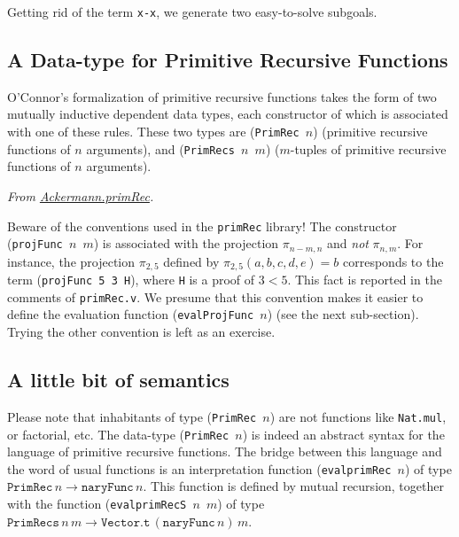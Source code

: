   Getting rid of the term \texttt{x-x}, we generate two easy-to-solve subgoals.

\vspace{6pt}
\noindent

  
\subsection{A Data-type for Primitive Recursive Functions}

O'Connor's formalization of primitive recursive functions takes the form of two mutually inductive dependent data types, each constructor of which is associated with one of these  rules.
These two types are (\texttt{PrimRec $n$}) (primitive recursive functions of $n$ arguments), and
(\texttt{PrimRecs $n$ $m$}) ($m$-tuples of primitive recursive functions of $n$ arguments).



\label{def:Primrec}
\vspace{4pt}
\noindent
\emph{From \href{../theories/html/hydras.Ackermann.primRec.html}{Ackermann.primRec}.}



\begin{remark}
\label{projFunc-order-of-args}
Beware of the conventions used in the \texttt{primRec} library!
The constructor (\texttt{projFunc $n$ $m$})  is associated with the projection $\pi_{n-m,n}$ and \emph{not}
$\pi_{n, m}$.
For instance, the projection $\pi_{2,5}$ defined by $\pi_{2,5}(a,b,c,d,e)=b$ corresponds to the term
(\texttt{projFunc 5 3 H}), where \texttt{H} is a proof of $3<5$.
 This fact is reported in the comments of \texttt{primRec.v}. We presume that this convention makes it easier to define the evaluation function (\texttt{evalProjFunc $n$}) (see the next sub-section). Trying the other convention is left as an exercise.
\end{remark}



\subsection{A little bit of semantics} 
Please note that inhabitants of type (\texttt{PrimRec $n$}) are not \coq{} functions like \texttt{Nat.mul}, or factorial, etc. The data-type (\texttt{PrimRec $n$}) is indeed an abstract syntax for the language of primitive recursive functions. The bridge between this language and the word of usual functions
is an interpretation function (\texttt{evalprimRec $n$})  of type
$\texttt{PrimRec}\,n \rightarrow  \texttt{naryFunc}\,n$.
This function is defined by mutual recursion,  together with the  function 
(\texttt{evalprimRecS $n$ $m$}) of type 
$\texttt{PrimRecs}\,n\,m \rightarrow  \texttt{Vector.t}\,(\texttt{naryFunc}\,n)\,m$.

